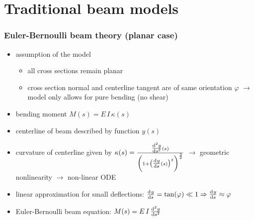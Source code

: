 \section{Traditional beam models}

\begin{frame}
  \frametitle{Euler-Bernoulli beam theory (planar case)}
  
  \begin{itemize}
    \item assumption of the model
      \begin{itemize}
        \item all cross sections remain planar
        \item cross section normal and centerline tangent are of same orientation $\varphi$ \newline
          \null \quad $\rightarrow$ model only allows for pure bending (no shear)
      \end{itemize}
    \item bending moment $M(s) = E \, I \, \kappa(s)$
    \item centerline of beam described by function $y(s)$
    \item curvature of centerline given by $\kappa(s) = \frac{\od[2]{y}{s}(s)}{\biggl( 1 + \bigl( \od{y}{s}(s) \bigr)^2 \biggr)^{\frac{3}{2}}}$ \newline
      \null \quad $\rightarrow$ geometric nonlinearity $\rightarrow$ non-linear ODE
    \item linear approximation for small deflections: $\od{y}{s} = \tan(\varphi) \ll 1 \Rightarrow \od{y}{s} \approx \varphi$
    \item Euler-Bernoulli beam equation: $M(s) = E \, I \, \od[2]{y}{s}$
  \end{itemize}
  
\end{frame}



